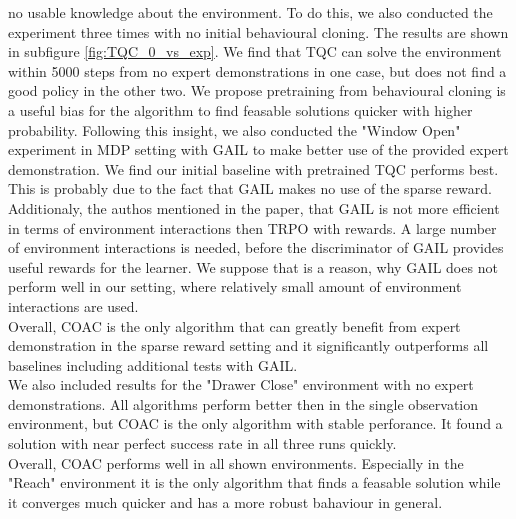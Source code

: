 no usable knowledge about the environment. To do this, we also conducted the experiment three times with no initial behavioural cloning. The results are shown in 
subfigure \ref{fig:TQC_0_vs_exp}. We find that TQC can solve the environment within 5000 steps from no expert demonstrations in one case, but does not find a good policy in the other two. 
We propose pretraining from behavioural cloning is a useful bias for the algorithm to find feasable solutions quicker with higher probability. Following this insight, 
we also conducted the "Window Open" experiment in MDP setting with GAIL to make better use of the provided expert demonstration. We find our initial 
baseline with pretrained TQC performs best. This is probably due to the fact that GAIL makes no use of the sparse reward. Additionaly, 
the authos mentioned in the paper, that GAIL is not more efficient in terms of environment interactions then TRPO with rewards. A large number of 
environment interactions is needed, before the discriminator of GAIL provides useful rewards for the learner. We suppose that is a reason, why GAIL does not perform 
well in our setting, where relatively small amount of environment interactions are used. \\

Overall, COAC is the only algorithm that can greatly benefit from expert demonstration in the sparse reward setting and 
it significantly outperforms all baselines including additional tests with GAIL. \\

We also included results for the "Drawer Close" environment with no expert demonstrations. All algorithms perform better then in the single observation environment, 
but COAC is the only algorithm with stable perforance. It found a solution with near perfect success rate in all three runs quickly. \\
Overall, COAC performs well in all shown environments. Especially in the "Reach" environment it is the only algorithm that finds a feasable solution while it 
converges much quicker and has a more robust bahaviour in general. 

